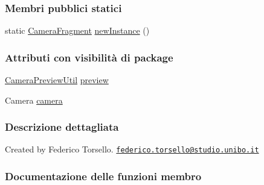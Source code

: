 \subsubsection*{Membri pubblici statici}
\begin{DoxyCompactItemize}
\item 
static \hyperlink{classit_1_1unibo_1_1torsello_1_1bluetoothpositioning_1_1fragment_1_1CameraFragment}{Camera\+Fragment} \hyperlink{classit_1_1unibo_1_1torsello_1_1bluetoothpositioning_1_1fragment_1_1CameraFragment_a06506c839e3206fbe082ab705cb627b5_a06506c839e3206fbe082ab705cb627b5}{new\+Instance} ()
\end{DoxyCompactItemize}
\subsubsection*{Attributi con visibilità di package}
\begin{DoxyCompactItemize}
\item 
\hyperlink{classit_1_1unibo_1_1torsello_1_1bluetoothpositioning_1_1util_1_1CameraPreviewUtil}{Camera\+Preview\+Util} \hyperlink{classit_1_1unibo_1_1torsello_1_1bluetoothpositioning_1_1fragment_1_1CameraFragment_af14f8f1e4107c9a9063cf70d1fbb5bb5_af14f8f1e4107c9a9063cf70d1fbb5bb5}{preview}
\item 
Camera \hyperlink{classit_1_1unibo_1_1torsello_1_1bluetoothpositioning_1_1fragment_1_1CameraFragment_a70e1c67d2b127530751de08cb289b4c3_a70e1c67d2b127530751de08cb289b4c3}{camera}
\end{DoxyCompactItemize}


\subsubsection{Descrizione dettagliata}
Created by Federico Torsello. \href{mailto:federico.torsello@studio.unibo.it}{\tt federico.\+torsello@studio.\+unibo.\+it} 

\subsubsection{Documentazione delle funzioni membro}
\hypertarget{classit_1_1unibo_1_1torsello_1_1bluetoothpositioning_1_1fragment_1_1CameraFragment_a06506c839e3206fbe082ab705cb627b5_a06506c839e3206fbe082ab705cb627b5}{}\label{classit_1_1unibo_1_1torsello_1_1bluetoothpositioning_1_1fragment_1_1CameraFragment_a06506c839e3206fbe082ab705cb627b5_a06506c839e3206fbe082ab705cb627b5} 
